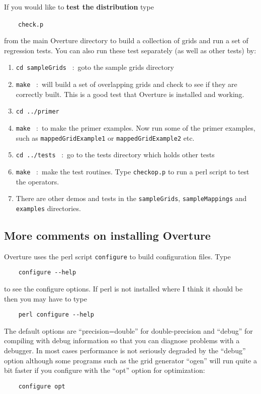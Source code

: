 \documentclass{article}
\begin{document}
If you would like to {\bf test the distribution} type 
\begin{flushleft}
  ~~~~{\tt check.p} 
\end{flushleft}
from the main Overture directory to build a collection of grids and run a set of regression tests. 
You can also run these test separately (as well as other tests) by: 
\begin{enumerate}
    \item {\tt cd sampleGrids} ~:~goto the sample grids directory
    \item {\tt make} ~:~will build a set of overlapping grids and check to see if they are correctly built.
                This is a good test that Overture is installed and working. 
    \item {\tt cd ../primer}
    \item {\tt make}  ~:~to make the primer examples. Now run some of the primer examples, such as
    {\tt mappedGridExample1} or {\tt mappedGridExample2} etc.
    \item {\tt cd ../tests} ~:~go to the tests directory which holds other tests
    \item {\tt make} ~:~make the test routines. Type {\tt checkop.p} to run a perl script
         to test the operators. 
    \item There are other demos and tests in the {\tt sampleGrids}, {\tt sampleMappings} and {\tt examples}
          directories.
\end{enumerate}
 

\subsection{More comments on installing Overture}

Overture uses the perl script {\tt configure} to build configuration files. Type
\begin{verbatim}
    configure --help
\end{verbatim}
to see the configure options. If perl is not installed where I think it should be then you may have
to type
\begin{verbatim}
    perl configure --help
\end{verbatim}
The default options are ``precision=double'' for double-precision and
``debug'' for compiling with debug information so that you can diagnose problems with a 
debugger. In most cases performance is not seriously degraded by the ``debug'' option although some
programs such as the grid generator ``ogen'' will run quite a bit faster if you configure
with the ``opt'' option for optimization:
\begin{verbatim}
    configure opt
\end{verbatim}
\end{document}
